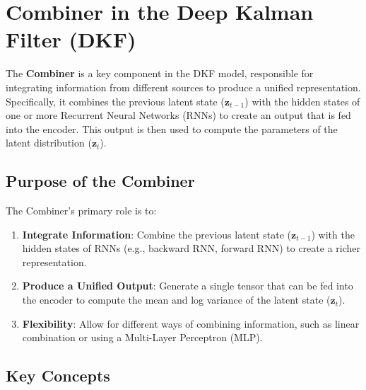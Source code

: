 \section{Combiner in the Deep Kalman Filter (DKF)}\label{combiner_info}
    
The \textbf{Combiner} is a key component in the DKF model, responsible 
for integrating information from different sources to produce a unified 
representation. Specifically, it combines the previous latent state 
($\bm{z}_{t-1}$) with the hidden states of one or more Recurrent Neural 
Networks (RNNs) to create an output that is fed into the encoder. 
This output is then used to compute the parameters of the latent 
distribution ($\bm{z}_t$).

\subsection*{Purpose of the Combiner}

The Combiner's primary role is to:
\begin{enumerate}
    \item \textbf{Integrate Information}: Combine the previous latent 
    state ($\bm{z}_{t-1}$) with the hidden states of RNNs (e.g., backward RNN, 
    forward RNN) to create a richer representation.
    \item \textbf{Produce a Unified Output}: Generate a single tensor that 
    can be fed into the encoder to compute the mean and log variance of the 
    latent state ($\bm{z}_t$).
    \item \textbf{Flexibility}: Allow for different ways of combining 
    information, such as linear combination or using a Multi-Layer 
    Perceptron (MLP).
\end{enumerate}

\subsection*{Key Concepts}

